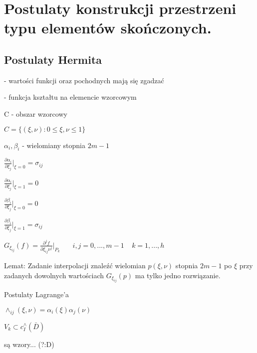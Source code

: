 \section{Postulaty konstrukcji przestrzeni typu elementów skończonych.}

\subsection{Postulaty Hermita}

- wartości funkcji oraz pochodnych mają się zgadzać

- funkcja kształtu na elemencie wzorcowym 

C - obszar wzorcowy 

$C = \{ (\xi,\nu): 0 \leqslant \xi,\nu \leqslant 1 \}$

$\alpha _i, \beta _i$ - wielomiany stopnia $2m - 1$

$\frac{\partial \alpha _i}{\partial \xi _j} |_{\xi = 0} = \sigma_{ij}$

$\frac{\partial \alpha _i}{\partial \xi _j} |_{\xi = 1} = 0$

$\frac{\partial \beta _i}{\partial \xi _j} |_{\xi = 0} = 0$

$\frac{\partial \beta _i}{\partial \xi _j} |_{\xi = 1} = \sigma_{ij}$

$G_{\xi_{ij}}(f) = \frac{\partial^j f}{\partial \xi_{ij} \nu^j} |_{P_k}\ \ \ \ \ \ \ \ i,j = 0,...,m-1\ \ \ \ \ k=1,...,h$

Lemat: Zadanie interpolacji znaleźć wielomian $p(\xi,\nu)$ stopnia $2m-1$ po $\xi$ przy zadanych dowolnych wartościach $G_{\xi_{ij}}(p)$ ma tylko jedno rozwiązanie.

Postulaty Lagrange'a

$\wedge_{ij} (\xi, \nu) = \alpha _i(\xi) \alpha _j(\nu)$

$V_k \subset c_I^\wedge (\bar{D})$

są wzory... (?:D)
